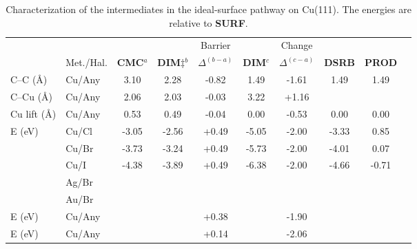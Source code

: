 \documentclass[aps,prl,reprint,amsmath,amssymb,floatfix,notitlepage]{revtex4-1}
\begin{document}
\begin{table*}
\centering
\caption{Characterization of the intermediates in the ideal-surface pathway on Cu(111). %
The energies are relative to \textbf{SURF}.
}
\label{table:idealsurface}
\begin{tabular}{ llcccccccc  }
 \hline
 \hline
  & & &  & Barrier & & Change & &\\
  & Met./Hal. & \textbf{CMC}$^{a}$ & \textbf{DIM$\ddagger$}$^{b}$ & $\Delta^{(b-a)}$ &  \textbf{DIM}$^{c}$ & $\Delta^{(c-a)}$  & \textbf{DSRB} & \textbf{PROD} \\ 
 \hline 
 C--C (\si{\angstrom}) & Cu/Any & 3.10 & 2.28 & -0.82 & 1.49 & -1.61 & 1.49 & 1.49 \\ 
 \hline
 C--Cu (\si{\angstrom}) & Cu/Any & 2.06 & 2.03 & -0.03 & 3.22 & +1.16 & & \\
 \hline
 Cu lift (\si{\angstrom}) & Cu/Any & 0.53 & 0.49& -0.04  & 0.00 & -0.53 & 0.00 & 0.00 \\
 \hline
 \multirow{3}{*}{E (\si{\electronvolt}) } & Cu/Cl & -3.05 &-2.56 &+0.49 & -5.05 & -2.00& -3.33&0.85\\ 
 & Cu/Br & -3.73 & -3.24 &+0.49 & -5.73 & -2.00& -4.01&0.07\\ 
 & Cu/I  & -4.38 & -3.89 & +0.49 & -6.38 & -2.00& -4.66&-0.71\\ 
 \hline
 & Ag/Br &  &  & &  & & & \\ 
 \hline
 & Au/Br &  &  & &  & & & \\ 
 \hline
 E (\si{\electronvolt})~\cite{pccp2010} & Cu/Any &  &  & +0.38& & -1.90 & & \\
 \hline
 E (\si{\electronvolt})~\cite{jacs2013} & Cu/Any & &  & +0.14& & -2.06 & &\\
 \hline
 \hline
\end{tabular}
\end{table*}
\end{document}

